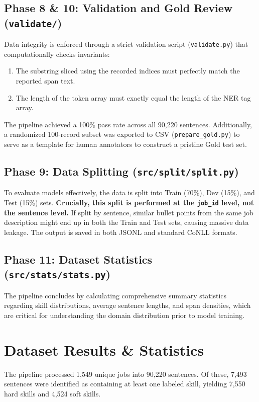 \documentclass[11pt, a4paper]{article}
\begin{document}
\subsection{Phase 8 \& 10: Validation and Gold Review (\texttt{validate/})}
Data integrity is enforced through a strict validation script (\texttt{validate.py}) that computationally checks invariants:
\begin{enumerate}
    \item The substring sliced using the recorded indices must perfectly match the reported span text.
    \item The length of the token array must exactly equal the length of the NER tag array.
\end{enumerate}
The pipeline achieved a 100\% pass rate across all 90,220 sentences. Additionally, a randomized 100-record subset was exported to CSV (\texttt{prepare\_gold.py}) to serve as a template for human annotators to construct a pristine Gold test set.

\subsection{Phase 9: Data Splitting (\texttt{src/split/split.py})}
To evaluate models effectively, the data is split into Train (70\%), Dev (15\%), and Test (15\%) sets. \textbf{Crucially, this split is performed at the \texttt{job\_id} level, not the sentence level.} If split by sentence, similar bullet points from the same job description might end up in both the Train and Test sets, causing massive data leakage. The output is saved in both JSONL and standard CoNLL formats.

\subsection{Phase 11: Dataset Statistics (\texttt{src/stats/stats.py})}
The pipeline concludes by calculating comprehensive summary statistics regarding skill distributions, average sentence lengths, and span densities, which are critical for understanding the domain distribution prior to model training.

\section{Dataset Results \& Statistics}
The pipeline processed 1,549 unique jobs into 90,220 sentences. Of these, 7,493 sentences were identified as containing at least one labeled skill, yielding 7,550 hard skills and 4,524 soft skills.
\end{document}
